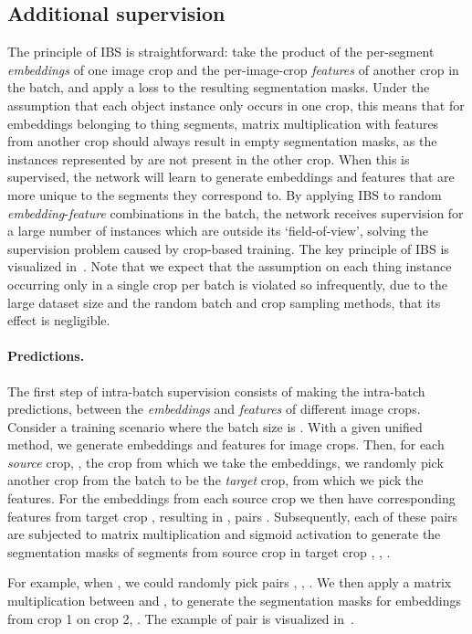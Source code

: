 \documentclass[10pt,twocolumn,letterpaper]{article}
\begin{document}
\subsection{Additional supervision}
\label{sec:method:ibs}
The principle of IBS is straightforward: take the product of the per-segment \textit{embeddings}  of one image crop and the per-image-crop \textit{features}  of another crop in the batch, and apply a loss to the resulting segmentation masks. Under the assumption that each object instance only occurs in one crop, this means that for embeddings  belonging to thing segments, matrix multiplication with features  from another crop should always result in empty segmentation masks, as the instances represented by  are not present in the other crop. When this is supervised, the network will learn to generate embeddings and features that are more unique to the segments they correspond to. By applying IBS to random \textit{embedding}-\textit{feature} combinations in the batch, the network receives supervision for a large number of instances which are outside its `field-of-view', solving the supervision problem caused by crop-based training. The key principle of IBS is visualized in~. Note that we expect that the assumption on each thing instance occurring only in a single crop per batch is violated so infrequently, due to the large dataset size and the random batch and crop sampling methods, that its effect is negligible.


\paragraph{Predictions.}
The first step of intra-batch supervision consists of making the intra-batch predictions, between the \textit{embeddings} and \textit{features} of different image crops. Consider a training scenario where the batch size is . With a given unified method, we generate embeddings  and features  for  image crops. Then, for each \textit{source} crop, \ie, the crop from which we take the embeddings, we randomly pick another crop from the batch to be the \textit{target} crop, from which we pick the features. For the embeddings  from each source crop  we then have corresponding features  from target crop , resulting in , pairs . Subsequently, each of these pairs are subjected to matrix multiplication and sigmoid activation to generate the segmentation masks of segments from source crop  in target crop , \ie, .

For example, when , we could randomly pick pairs , , . We then apply a matrix multiplication between  and , to generate the segmentation masks for embeddings from crop 1 on crop 2, . The example of pair  is visualized in~.
\end{document}
